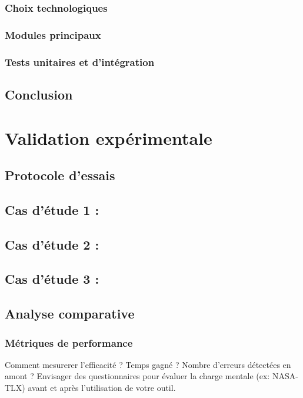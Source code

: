 \documentclass[a4paper,12pt]{article}
\begin{document}
\subsubsection{Choix technologiques}
\label{sec:orgae546d3}
\subsubsection{Modules principaux}
\label{sec:org61fa989}
\subsubsection{Tests unitaires et d'intégration}
\label{sec:org94580ef}
\subsection{Conclusion}
\label{sec:org3907dff}
\clearpage
\section{Validation expérimentale}
\label{sec:orga72a628}
\subsection{Protocole d'essais}
\label{sec:orge98a348}

\subsection{Cas d'étude 1 :}
\label{sec:orgda6ad2c}
\subsection{Cas d'étude 2 :}
\label{sec:org824cf16}
\subsection{Cas d'étude 3 :}
\label{sec:orgdb22885}

\subsection{Analyse comparative}
\label{sec:org1e3ba92}
\subsubsection{Métriques de performance}
\label{sec:orge1adc19}
Comment mesurerer l'efficacité ? Temps gagné ? Nombre d'erreurs détectées en amont ?
Envisager des questionnaires pour évaluer la charge mentale (ex: NASA-TLX) avant et après l'utilisation de votre outil.
\end{document}
